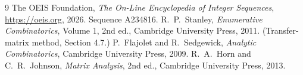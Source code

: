 \documentclass[11pt,a4paper]{article}
\theoremstyle{plain}
\theoremstyle{definition}
\begin{document}
\begin{thebibliography}{9}
 The OEIS Foundation, \emph{The On-Line Encyclopedia of Integer
Sequences}, \url{https://oeis.org}, 2026. Sequence A234816.
 R.~P.~Stanley, \emph{Enumerative Combinatorics}, Volume 1, 2nd ed.,
Cambridge University Press, 2011. (Transfer-matrix method, Section 4.7.)
 P.~Flajolet and R.~Sedgewick, \emph{Analytic Combinatorics}, Cambridge
University Press, 2009.
 R.~A.~Horn and C.~R.~Johnson, \emph{Matrix Analysis}, 2nd ed., Cambridge
University Press, 2013.
\end{thebibliography}
\end{document}
